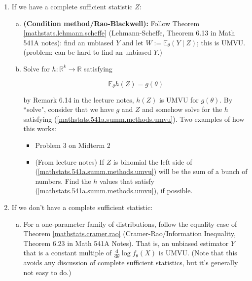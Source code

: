 \documentclass{article}
\newcommand{\deriv}[2]{\frac{\mathrm{d} #1}{\mathrm{d} #2}}
\newcommand{\E}{\mathbb{E}}
\theoremstyle{definition}
\theoremstyle{definition}
\theoremstyle{definition}
\theoremstyle{definition}
\theoremstyle{definition}
\theoremstyle{definition}
\theoremstyle{definition}
\begin{document}
\begin{enumerate}[(1)]

\item If we have a complete sufficient statistic \(Z\):

\begin{enumerate}[(a)]

\item \textbf{(Condition method/Rao-Blackwell):} Follow Theorem \ref{mathstats.lehmann.scheffe} (Lehmann-Scheffe, Theorem 6.13 in Math 541A notes): find an unbiased \(Y\) and let \(W:= \E_\theta(Y \mid Z)\); this is UMVU. (problem: can be hard to find an unbiased \(Y\).)

\item Solve for \(h: \mathbb{R}^k \to \mathbb{R}\) satisfying

 \begin{equation}\label{mathstats.541a.summ.methods.umvu}
\E_\theta h(Z) = g(\theta)
\end{equation}

by Remark 6.14 in the lecture notes, \(h(Z)\) is UMVU for \(g(\theta)\). By ``solve", consider that we have \(g\) and \(Z\) and somehow solve for the \(h\) satisfying (\ref{mathstats.541a.summ.methods.umvu}). Two examples of how this works:

\begin{itemize}

\item Problem 3 on Midterm 2

\item (From lecture notes) If \(Z\) is binomial the left side of (\ref{mathstats.541a.summ.methods.umvu}) will be the sum of a bunch of numbers. Find the \(h\) values that satisfy (\ref{mathstats.541a.summ.methods.umvu}), if possible.

\end{itemize}

\end{enumerate}

\item If we don't have a complete sufficient statistic:

\begin{enumerate}[(a)]

\item For a one-parameter family of distributions, follow the equality case of Theorem \ref{mathstats.cramer.rao} (Cramer-Rao/Information Inequality, Theorem 6.23 in Math 541A Notes). That is, an unbiased estimator \(Y\) that is a constant multiple of \(\deriv{}{\theta}  \log f_\theta (X) \) is UMVU. (Note that this avoids any discussion of complete sufficient statistics, but it's generally not easy to do.)


\end{enumerate}
\end{enumerate}
\end{document}
